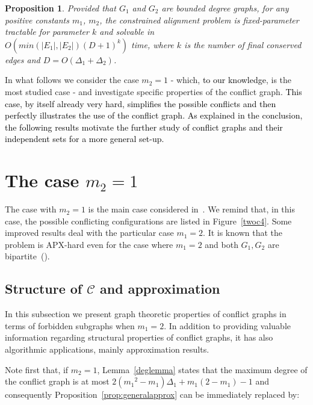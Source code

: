 \documentclass[final]{dmtcs-episciences}
\newtheorem{proposition}[theorem]{Proposition}
\newcommand\mar[1]{\textcolor{black}{#1}}
\begin{document}
\begin{proposition}\label{prop:parameter1}
Provided that $G_1$ and $G_2$ are bounded degree graphs, for any positive constants $m_1$, $m_2$, 
the constrained alignment problem is fixed-parameter tractable for parameter $k$ and 
solvable in\\ $O(min(|E_1|,|E_2|)(D+1)^k)$ time, where $k$ is the number of final conserved edges and $D=O(\Delta_1+\Delta_2)$.
\end{proposition}

In what follows we consider the case $m_2=1$ \-- which, \mar{to our knowledge}, is the most studied case \-- and investigate specific properties of the conflict graph. \mar{This case, by itself already very hard, simplifies the possible conflicts and then perfectly illustrates the use of the conflict graph. As explained in the conclusion, the following results motivate the further study of conflict graphs and their independent sets for a more general set-up. } 


\section{The case $m_2=1$}\label{sec:m2is1}


The case with $m_2=1$ is the main case considered in~\citet{Fertin200990}.  We remind that, in this case,  the possible conflicting configurations are listed in Figure~\ref{twoc4}.  Some improved results deal with the particular case $m_1=2$. 
It is 
known that the problem is APX-hard even for the case where
$m_1=2$ and both $G_1, G_2$ are bipartite~(\citet{Fertin200990}). 

 


\subsection{Structure of $\mathcal{C}$ and approximation}\label{subsec:struct-approx}


In this subsection we present graph theoretic properties of conflict graphs in terms of forbidden subgraphs when $m_1=2$. 
In addition to providing valuable information regarding 
structural properties of conflict graphs, it has also algorithmic applications, mainly approximation results. 

Note first that, if $m_2=1$, Lemma~\ref{deglemma} states that the maximum degree of the conflict graph is at most $2({m_1}^2-m_1)\Delta_1 +m_1(2-m_1)-1$ and consequently Proposition~\ref{prop:generalapprox} can be immediately replaced by:
\end{document}
